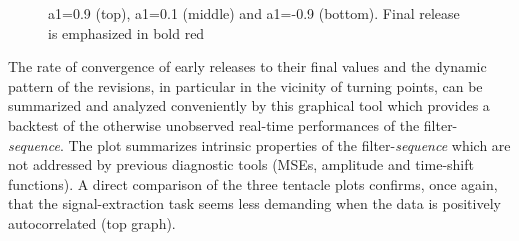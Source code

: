 \documentclass[a4paper]{book}
\begin{document}
\begin{enumerate}
\begin{figure}[H]
\begin{center}
{  a1=0.9 (top), a1=0.1 (middle) and a1=-0.9 (bottom). Final release is emphasized in bold red\label{z_vintages}}\end{center}\end{figure}The rate of convergence of early releases to their final values and the dynamic pattern of the revisions, in particular in the vicinity of turning points, can be summarized and analyzed conveniently by this graphical tool which provides a backtest of the otherwise unobserved real-time performances of the filter-\emph{sequence}. The plot summarizes intrinsic properties of the filter-\emph{sequence} which are not addressed by previous diagnostic tools (MSEs, amplitude and time-shift functions). A direct comparison of the three tentacle plots confirms, once again, that the signal-extraction task seems less demanding when the data is positively autocorrelated (top graph).


\end{enumerate}
\end{document}
